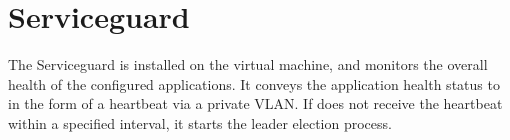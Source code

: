 \section{Serviceguard} \label{sec:guard}

The Serviceguard is installed on the virtual machine, and monitors the overall health of 
the configured applications. It conveys the application health status to \smrsystem in the 
form of a heartbeat via a private VLAN. If \smrsystem does not receive the heartbeat within 
a specified interval, it starts the leader election process. 
